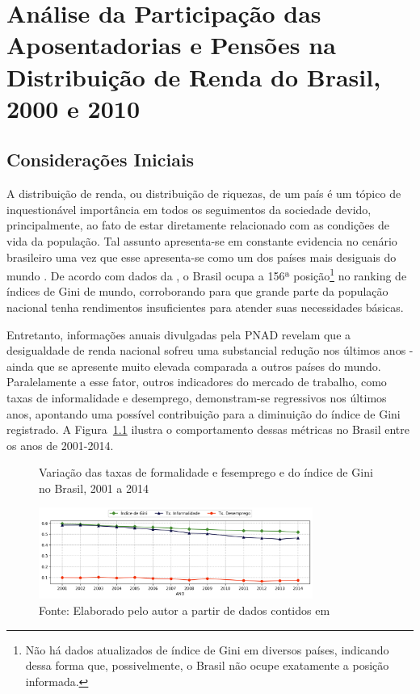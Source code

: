 \chapter{Análise da Participação das Aposentadorias e Pensões na Distribuição de Renda do Brasil, 2000 e 2010}

\section{Considerações Iniciais}

A distribuição de renda, ou distribuição de riquezas, de um país é um tópico de inquestionável importância em todos os seguimentos da sociedade devido, principalmente, ao fato de estar diretamente relacionado com as condições de vida da população. Tal assunto apresenta-se em constante evidencia no cenário brasileiro uma vez que esse apresenta-se como um dos países mais desiguais do mundo \cite{cap04_ref2, cap04_ref3}. De acordo com dados da \cite{cap04_ref1}, o Brasil ocupa a 156ª posição\footnote{Não há dados atualizados de índice de Gini em diversos países, indicando dessa forma que, possivelmente, o Brasil não ocupe exatamente a posição informada.}  no ranking de índices de Gini de mundo, corroborando para que grande parte da população nacional tenha rendimentos insuficientes para atender suas necessidades básicas.

Entretanto, informações anuais divulgadas pela PNAD revelam que a desigualdade de renda nacional sofreu uma substancial redução nos últimos anos \cite{cap04_ref4} - ainda que se apresente muito elevada comparada a outros países do mundo. Paralelamente a esse fator, outros indicadores do mercado de trabalho, como taxas de informalidade e desemprego, demonstram-se regressivos nos últimos anos, apontando uma possível contribuição para a diminuição do índice de Gini registrado. A Figura~\ref{fig:cap04:gini_taxas} ilustra o comportamento dessas métricas no Brasil entre os anos de 2001-2014.

\begin{figure}[!h]
    \centering
    \caption{Variação das taxas de formalidade e fesemprego e do índice de Gini no Brasil, 2001 a 2014}
    \includegraphics[width=0.8\textwidth]{figs/cap04_gini_taxas.pdf}
    \caption*{\footnotesize{Fonte: Elaborado pelo autor a partir de dados contidos em  \cite{cap04_ref4}}}
    \label{fig:cap04:gini_taxas}
\end{figure}

